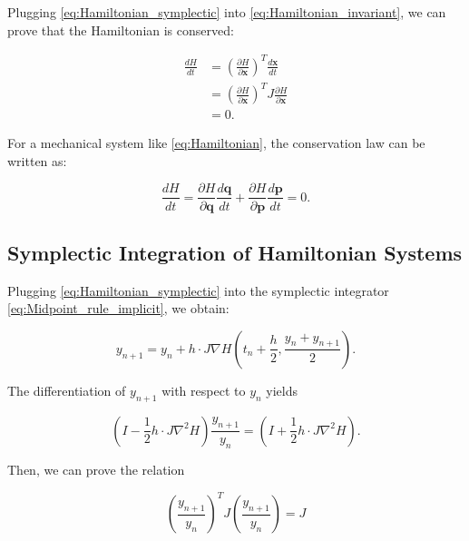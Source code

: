 \documentclass[
	parskip, 			   %
	twoside, 			   %
	DIV=14, 			   %
	BCOR=15.0mm, 		   %
	headsepline, 		   %
	open=right, 		   %
	captions=tableheading, %
	bibliography=totoc,    %
	numbers=noenddot       %
]{scrreprt}
\begin{document}
Plugging \ref{eq:Hamiltonian_symplectic} into \ref{eq:Hamiltonian_invariant}, we can prove that the Hamiltonian is conserved:

\begin{equation}
    \label{eq:Hamiltonian_symplectic_conclusion}
    \begin{aligned}
        \frac{dH}{dt} &= (\frac{\partial H}{\partial \mathbf{x}})^T \frac{d\mathbf{x}}{dt}\\
         &= (\frac{\partial H}{\partial \mathbf{x}})^T J \frac{\partial H}{\partial \mathbf{x}} \\
         &= 0.
    \end{aligned}
\end{equation}


For a mechanical system like \ref{eq:Hamiltonian}, the conservation law can be written as:

\begin{equation}
    \label{eq:Hamiltonian_invariant_in_mechaniacal_system}
    \frac{dH}{dt} = \frac{\partial H}{\partial \mathbf{q}} \frac{d \mathbf{q}}{dt} + \frac{\partial H}{\partial \mathbf{p}} \frac{d \mathbf{p}}{dt} = 0.
\end{equation}

\subsection{Symplectic Integration of Hamiltonian Systems}
Plugging \ref{eq:Hamiltonian_symplectic} into the symplectic integrator \ref{eq:Midpoint_rule_implicit}, we obtain:

\begin{equation}
    \label{eq:Midpoint_rule_implicit_Hamiltonian}
    y_{n+1} = y_{n} + h \cdot J \nabla H (t_{n}+\frac{h}{2} ,\frac{y_{n} + y_{n+1}}{2}).
\end{equation}

The differentiation of $y_{n+1}$ with respect to $y_{n}$ yields

\begin{equation}
    \label{eq:Midpoint_rule_implicit_Hamiltonian_differentiation}
    (I - \frac{1}{2} h \cdot J \nabla^2 H) \frac{y_{n+1}}{y_{n}} = (I + \frac{1}{2} h \cdot J \nabla^2 H).
\end{equation}

Then, we can prove the relation

\begin{equation}
    \label{eq:Midpoint_rule_implicit_symplecticity}
    (\frac{y_{n+1}}{y_{n}})^T J (\frac{y_{n+1}}{y_{n}}) = J
\end{equation}
\end{document}
